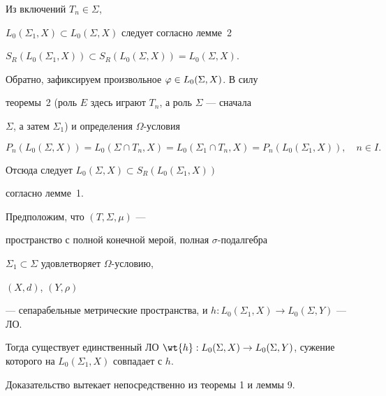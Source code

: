 \begin{pf} Из включений $T_n\in\Sigma$,


$L_0(\Sigma_1,X)\subset L_0(\Sigma,X)$ следует согласно лемме~2\;


$S_R(L_0(\Sigma_1,X))\subset S_R(L_0(\Sigma,X))=L_0(\Sigma,X)$.





Обратно, зафиксируем произвольное $\varphi\in L_0(\Sigma,X)$. В силу


теоремы~2 (роль $E$ здесь играют $T_n$, а роль $\Sigma$ --- сначала


$\Sigma$, а затем $\Sigma_1$) и определения $\Omega$-усло\-вия


$$


P_n(L_0(\Sigma,X))=L_0(\Sigma\cap T_n,X)=L_0(\Sigma_1\cap T_n,X)=


P_n(L_0(\Sigma_1,X)), \quad n\in I.


$$


Отсюда следует $L_0(\Sigma,X)\subset S_R(L_0(\Sigma_1,X))$ 


согласно лемме~1.


\end{pf}





\begin{thm}


Предположим, что $(T,\Sigma,\mu)$ ---


пространство с полной конечной мерой, полная $\sigma$-подал\-геб\-ра


$\Sigma_1\subset\Sigma$ удовлетворяет $\Omega$-ус\-ло\-вию,


$(X,d)$, $(Y,\rho)$


--- сепарабельные метрические пространства, и $h:L_0(\Sigma_1,X)\to


L_0(\Sigma,Y)$ --- ЛО.





Тогда существует единственный ЛО $\wt{h}:L_0(\Sigma,X)\to


L_0(\Sigma,Y)$, сужение которого на $L_0(\Sigma_1,X)$ совпадает с $h$.


\end{thm}





Доказательство вытекает непосредственно из теоремы 1 и леммы 9.





